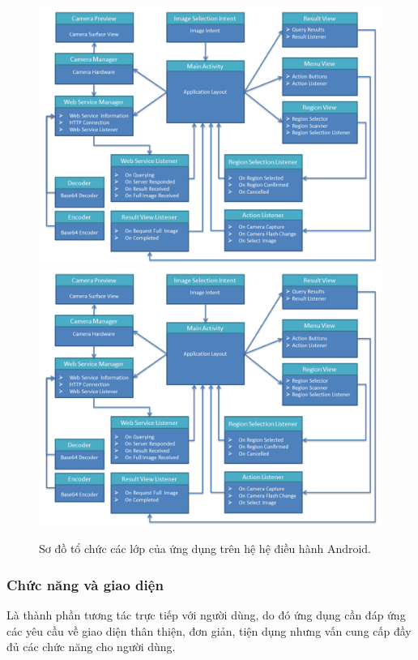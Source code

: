 {\begin{figure}[!htbp]
  \begin{center}
    \leavevmode
    \ifpdf
      \includegraphics[scale=0.19]{client_framework}
    \else
      \includegraphics[scale=0.19]{client_framework}
    \fi
    \caption[Sơ đồ tổ chức các lớp của ứng dụng trên hệ hệ điều hành Android.]{Sơ đồ tổ chức các lớp của ứng dụng trên hệ hệ điều hành Android.}
    \label{FigClientFramework}
  \end{center}
\end{figure}

\subsubsection{Chức năng và giao diện}
Là thành phần tương tác trực tiếp với người dùng, do đó ứng dụng cần đáp ứng các yêu cầu về giao diện thân thiện, đơn giản, tiện dụng nhưng vấn cung cấp đầy đủ các chức năng cho người dùng.

}
